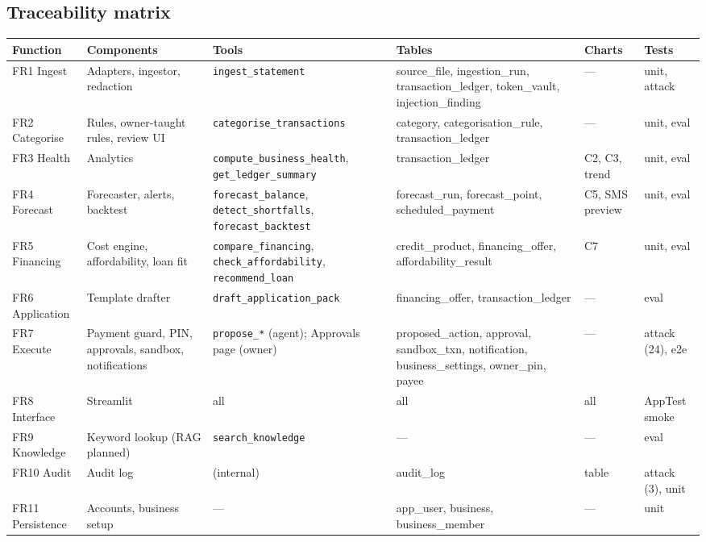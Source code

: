 \documentclass[10pt,a4paper]{article}
\newcommand{\code}[1]{\texttt{\small #1}}
\begin{document}
\subsection{Traceability matrix}
\begingroup\footnotesize
\begin{longtable}{@{}p{2.0cm}p{2.6cm}p{3.8cm}p{3.1cm}p{1.4cm}p{1.4cm}@{}}
\toprule
\textbf{Function} & \textbf{Components} & \textbf{Tools} & \textbf{Tables} & \textbf{Charts} & \textbf{Tests}\\
\midrule\endhead
FR1 Ingest & Adapters, ingestor, redaction & \code{ingest\_statement} & source\_file, ingestion\_run, transaction\_ledger, token\_vault, injection\_finding & --- & unit, attack\\
FR2 Categorise & Rules, owner-taught rules, review UI & \code{categorise\_transactions} & category, categorisation\_rule, transaction\_ledger & --- & unit, eval\\
FR3 Health & Analytics & \code{compute\_business\_health}, \code{get\_ledger\_summary} & transaction\_ledger & C2, C3, trend & unit, eval\\
FR4 Forecast & Forecaster, alerts, backtest & \code{forecast\_balance}, \code{detect\_shortfalls}, \code{forecast\_backtest} & forecast\_run, forecast\_point, scheduled\_payment & C5, SMS preview & unit, eval\\
FR5 Financing & Cost engine, affordability, loan fit & \code{compare\_financing}, \code{check\_affordability}, \code{recommend\_loan} & credit\_product, financing\_offer, affordability\_result & C7 & unit, eval\\
FR6 Application & Template drafter & \code{draft\_application\_pack} & financing\_offer, transaction\_ledger & --- & eval\\
FR7 Execute & Payment guard, PIN, approvals, sandbox, notifications & \code{propose\_*} (agent); Approvals page (owner) & proposed\_action, approval, sandbox\_txn, notification, business\_settings, owner\_pin, payee & --- & attack (24), e2e\\
FR8 Interface & Streamlit & all & all & all & AppTest smoke\\
FR9 Knowledge & Keyword lookup (RAG planned) & \code{search\_knowledge} & --- & --- & eval\\
FR10 Audit & Audit log & (internal) & audit\_log & table & attack (3), unit\\
FR11 Persistence & Accounts, business setup & --- & app\_user, business, business\_member & --- & unit\\
\bottomrule
\end{longtable}
\endgroup
\end{document}
